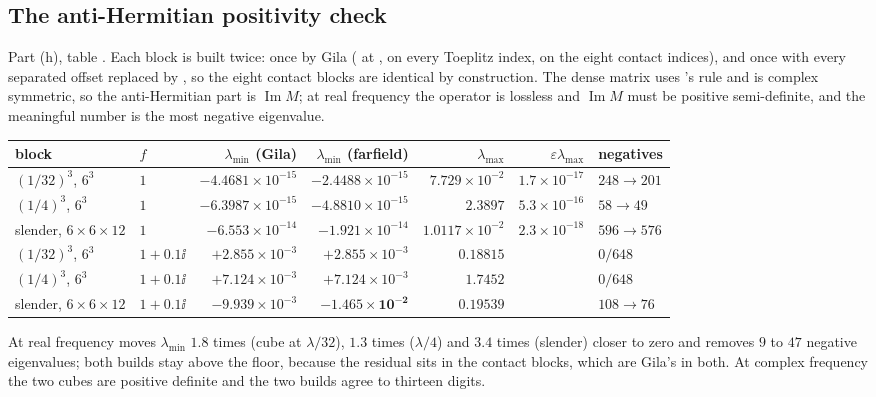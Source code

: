 \subsection{The anti-Hermitian positivity check}
\label{sec:ver:pos}

Part (h), table . Each block is built twice: once by Gila
( at ,  on every Toeplitz index,
 on the eight contact indices), and once with every separated offset
replaced by , so the eight contact blocks are identical by construction. The
dense matrix uses 's rule and is complex symmetric, so the anti-Hermitian
part is $\operatorname{Im}M$; at real frequency the operator is lossless and
$\operatorname{Im}M$ must be positive semi-definite, and the meaningful number is the most
negative eigenvalue.

\begin{center}\footnotesize
\begin{tabular}{@{}llrrrrl@{}}
\toprule
block & $f$ & $\lambda_{\min}$ (Gila) & $\lambda_{\min}$ (farfield) &
$\lambda_{\max}$ & $\varepsilon\lambda_{\max}$ & negatives\\
\midrule
$(1/32)^3$, $6^3$ & $1$ & $-4.4681\times10^{-15}$ & $-2.4488\times10^{-15}$ &
$7.729\times10^{-2}$ & $1.7\times10^{-17}$ & $248 \to 201$\\
$(1/4)^3$, $6^3$ & $1$ & $-6.3987\times10^{-15}$ & $-4.8810\times10^{-15}$ &
$2.3897$ & $5.3\times10^{-16}$ & $58 \to 49$\\
slender, $6{\times}6{\times}12$ & $1$ & $-6.553\times10^{-14}$ &
$-1.921\times10^{-14}$ & $1.0117\times10^{-2}$ & $2.3\times10^{-18}$ & $596 \to 576$\\
$(1/32)^3$, $6^3$ & $1+0.1\ii$ & $+2.855\times10^{-3}$ & $+2.855\times10^{-3}$ &
$0.18815$ & & $0/648$\\
$(1/4)^3$, $6^3$ & $1+0.1\ii$ & $+7.124\times10^{-3}$ & $+7.124\times10^{-3}$ &
$1.7452$ & & $0/648$\\
slender, $6{\times}6{\times}12$ & $1+0.1\ii$ & $-9.939\times10^{-3}$ &
$\mathbf{-1.465\times10^{-2}}$ & $0.19539$ & & $108 \to 76$\\
\bottomrule
\end{tabular}
\end{center}

At real frequency  moves $\lambda_{\min}$ $1.8$ times (cube at
$\lambda/32$), $1.3$ times ($\lambda/4$) and $3.4$ times (slender) closer to zero and
removes $9$ to $47$ negative eigenvalues; both builds stay above the  floor,
because the residual sits in the contact blocks, which are Gila's in both. At complex
frequency the two cubes are positive definite and the two builds agree to thirteen digits.

